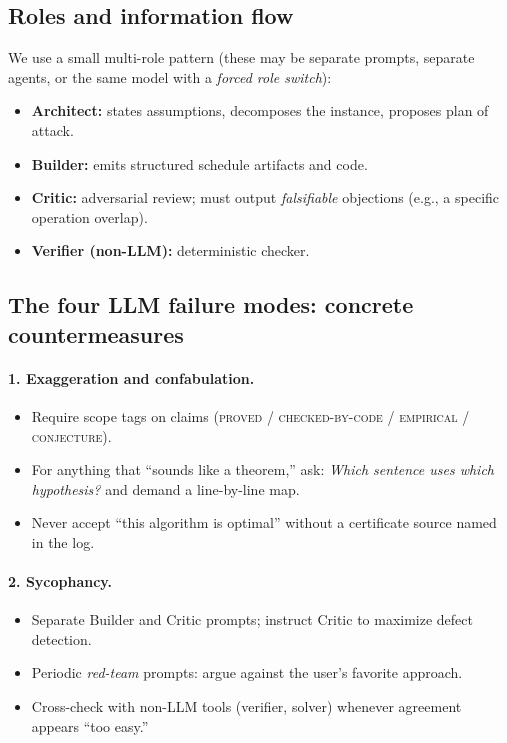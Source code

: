 \documentclass[11pt]{article}
\begin{document}
\subsection{Roles and information flow}
We use a small multi-role pattern (these may be separate prompts, separate agents, or the same model with a \emph{forced role switch}):
\begin{itemize}[noitemsep]
  \item \textbf{Architect:} states assumptions, decomposes the instance, proposes plan of attack.
  \item \textbf{Builder:} emits structured schedule artifacts and code.
  \item \textbf{Critic:} adversarial review; must output \emph{falsifiable} objections (e.g., a specific operation overlap).
  \item \textbf{Verifier (non-LLM):} deterministic checker.
\end{itemize}


\subsection{The four LLM failure modes: concrete countermeasures}

\paragraph{1. Exaggeration and confabulation.}
\begin{itemize}[noitemsep]
  \item Require scope tags on claims (\textsc{proved} / \textsc{checked-by-code} / \textsc{empirical} / \textsc{conjecture}).
  \item For anything that ``sounds like a theorem,'' ask: \emph{Which sentence uses which hypothesis?} and demand a line-by-line map.
  \item Never accept ``this algorithm is optimal'' without a certificate source named in the log.
\end{itemize}

\paragraph{2. Sycophancy.}
\begin{itemize}[noitemsep]
  \item Separate Builder and Critic prompts; instruct Critic to maximize defect detection.
  \item Periodic \emph{red-team} prompts: argue against the user's favorite approach.
  \item Cross-check with non-LLM tools (verifier, solver) whenever agreement appears ``too easy.''
\end{itemize}
\end{document}
